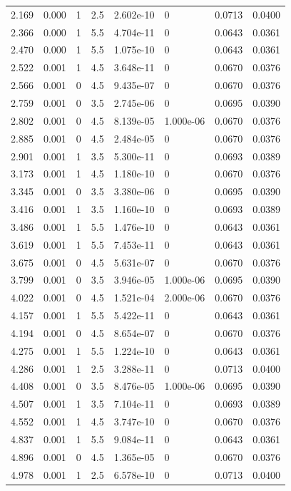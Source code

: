 \documentclass[preview]{standalone}
\begin{document}
{{\begin{tabular}{L{1.2cm}C{1.2cm} C{0.3cm}C{0.5cm} C{1.4cm}C{1.4cm} C{1.4cm}C{1.4cm}}
  2.169  &  0.000  & 1     & 2.5 &  2.602e-10  & 0  & 0.0713 &  0.0400   \\ 
  2.366  &  0.000  & 1     & 5.5 &  4.704e-11  & 0  & 0.0643 &  0.0361   \\ 
  2.470  &  0.000  & 1     & 5.5 &  1.075e-10  & 0  & 0.0643 &  0.0361   \\ 
  2.522  &  0.001  & 1     & 4.5 &  3.648e-11  & 0  & 0.0670 &  0.0376   \\ 
  2.566  &  0.001  & 0     & 4.5 &  9.435e-07  & 0  & 0.0670 &  0.0376   \\ 
  2.759  &  0.001  & 0     & 3.5 &  2.745e-06  & 0  & 0.0695 &  0.0390   \\ 
  2.802  &  0.001  & 0     & 4.5 &  8.139e-05  & 1.000e-06  & 0.0670 &  0.0376   \\ 
  2.885  &  0.001  & 0     & 4.5 &  2.484e-05  & 0  & 0.0670 &  0.0376   \\ 
  2.901  &  0.001  & 1     & 3.5 &  5.300e-11  & 0  & 0.0693 &  0.0389   \\ 
  3.173  &  0.001  & 1     & 4.5 &  1.180e-10  & 0  & 0.0670 &  0.0376   \\ 
  3.345  &  0.001  & 0     & 3.5 &  3.380e-06  & 0  & 0.0695 &  0.0390   \\ 
  3.416  &  0.001  & 1     & 3.5 &  1.160e-10  & 0  & 0.0693 &  0.0389   \\ 
  3.486  &  0.001  & 1     & 5.5 &  1.476e-10  & 0  & 0.0643 &  0.0361   \\ 
  3.619  &  0.001  & 1     & 5.5 &  7.453e-11  & 0  & 0.0643 &  0.0361   \\ 
  3.675  &  0.001  & 0     & 4.5 &  5.631e-07  & 0  & 0.0670 &  0.0376   \\ 
  3.799  &  0.001  & 0     & 3.5 &  3.946e-05  & 1.000e-06  & 0.0695 &  0.0390   \\ 
  4.022  &  0.001  & 0     & 4.5 &  1.521e-04  & 2.000e-06  & 0.0670 &  0.0376   \\ 
  4.157  &  0.001  & 1     & 5.5 &  5.422e-11  & 0  & 0.0643 &  0.0361   \\ 
  4.194  &  0.001  & 0     & 4.5 &  8.654e-07  & 0  & 0.0670 &  0.0376   \\ 
  4.275  &  0.001  & 1     & 5.5 &  1.224e-10  & 0  & 0.0643 &  0.0361   \\ 
  4.286  &  0.001  & 1     & 2.5 &  3.288e-11  & 0  & 0.0713 &  0.0400   \\ 
  4.408  &  0.001  & 0     & 3.5 &  8.476e-05  & 1.000e-06  & 0.0695 &  0.0390   \\ 
  4.507  &  0.001  & 1     & 3.5 &  7.104e-11  & 0  & 0.0693 &  0.0389   \\ 
  4.552  &  0.001  & 1     & 4.5 &  3.747e-10  & 0  & 0.0670 &  0.0376   \\ 
  4.837  &  0.001  & 1     & 5.5 &  9.084e-11  & 0  & 0.0643 &  0.0361   \\ 
  4.896  &  0.001  & 0     & 4.5 &  1.365e-05  & 0  & 0.0670 &  0.0376   \\ 
  4.978  &  0.001  & 1     & 2.5 &  6.578e-10  & 0  & 0.0713 &  0.0400   \\ 
\hline 
\end{tabular} 

}}
\end{document}
